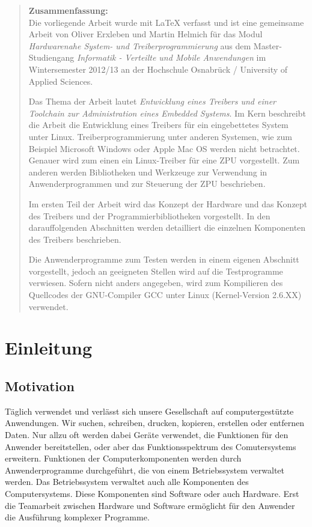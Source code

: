 \documentclass[11pt]{scrartcl}
\begin{document}
\thispagestyle{empty}
\pagebreak
\thispagestyle{empty}
\begin{abstract}
\textbf{Zusammenfassung:}\\ 	
Die vorliegende Arbeit wurde mit LaTeX verfasst und ist eine gemeinsame Arbeit von Oliver Erxleben und Martin Helmich für das Modul \textit{Hardwarenahe System- und Treiberprogrammierung} aus dem Master-Studiengang \textit{Informatik - Verteilte und Mobile Anwendungen} im Wintersemester 2012/13 an der Hochschule Osnabrück / University of Applied Sciences.


Das Thema der Arbeit lautet \textit{Entwicklung eines Treibers und einer Toolchain zur Administration eines Embedded Systems}. Im Kern beschreibt die Arbeit die Entwicklung eines Treibers für ein eingebettetes System unter Linux. Treiberprogrammierung unter anderen Systemen, wie zum Beispiel Microsoft Windows oder Apple Mac OS werden nicht betrachtet. Genauer wird zum einen ein Linux-Treiber für eine ZPU vorgestellt. Zum anderen werden Bibliotheken und Werkzeuge zur Verwendung in Anwenderprogrammen und zur Steuerung der ZPU beschrieben.


Im ersten Teil der Arbeit wird das Konzept der Hardware und das Konzept des Treibers und der Programmierbibliotheken vorgestellt. In den darauffolgenden Abschnitten werden detailliert die einzelnen Komponenten des Treibers beschrieben.


Die Anwenderprogramme zum Testen werden in einem eigenen Abschnitt vorgestellt, jedoch an geeigneten Stellen wird auf die Testprogramme verwiesen.
Sofern nicht anders angegeben, wird zum Kompilieren des Quellcodes der GNU-Compiler GCC unter Linux (Kernel-Version 2.6.XX) verwendet. 
\end{abstract}

\pagebreak

\pagestyle{fancy}
\setcounter{page}{1} 

\section{Einleitung}

\subsection{Motivation}

Täglich verwendet und verlässt sich unsere Gesellschaft auf computergestützte Anwendungen. Wir suchen, schreiben, drucken, kopieren, erstellen oder entfernen Daten. Nur allzu oft werden dabei Geräte verwendet, die Funktionen für den Anwender bereitstellen, oder aber das Funktionsspektrum des Comutersystems erweitern. Funktionen der Computerkomponenten werden durch Anwenderprogramme durchgeführt, die von einem Betriebssystem verwaltet werden. Das Betriebssystem verwaltet auch alle Komponenten des Computersystems. Diese Komponenten sind Software oder auch Hardware. Erst die Teamarbeit zwischen Hardware und Software ermöglicht für den Anwender die Ausführung komplexer Programme.
\end{document}
